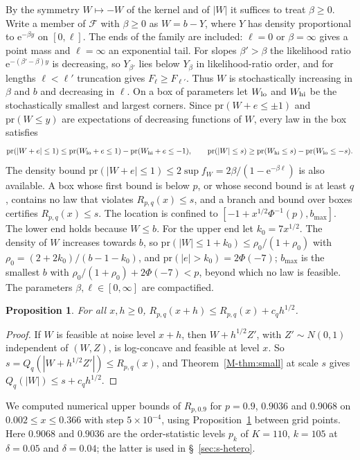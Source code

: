 \documentclass[11pt]{article}
\renewcommand{\_}{\usc\allowbreak}
\newtheorem{proposition}{Proposition}
\newcommand{\pr}{\mathrm{pr}}
\begin{document}
By the symmetry $W \mapsto -W$ of the kernel and of $|W|$ it suffices to treat $\beta \ge 0$. Write a member of $\mathcal F$ with $\beta \ge 0$ as $W = b - Y$, where $Y$ has density proportional to $\mathrm{e}^{-\beta y}$ on $[0,\ell]$. The ends of the family are included: $\ell = 0$ or $\beta = \infty$ gives a point mass and $\ell = \infty$ an exponential tail. For slopes $\beta' > \beta$ the likelihood ratio $\mathrm{e}^{-(\beta'-\beta)y}$ is decreasing, so $Y_{\beta'}$ lies below $Y_\beta$ in likelihood-ratio order, and for lengths $\ell < \ell'$ truncation gives $F_\ell \ge F_{\ell'}$. Thus $W$ is stochastically increasing in $\beta$ and $b$ and decreasing in $\ell$. On a box of parameters let $W_{\rm lo}$ and $W_{\rm hi}$ be the stochastically smallest and largest corners. Since $\pr(W + e \le \pm 1)$ and $\pr(W \le y)$ are expectations of decreasing functions of $W$, every law in the box satisfies
\[
\pr(|W+e| \le 1) \le \pr(W_{\rm lo} + e \le 1) - \pr(W_{\rm hi} + e \le -1),\qquad \pr(|W| \le s) \ge \pr(W_{\rm hi} \le s) - \pr(W_{\rm lo} \le -s).
\]
The density bound $\pr(|W+e| \le 1) \le 2\sup f_W = 2\beta/(1 - \mathrm{e}^{-\beta\ell})$ is also available. A box whose first bound is below $p$, or whose second bound is at least $q$, contains no law that violates $R_{p,q}(x) \le s$, and a branch and bound over boxes certifies $R_{p,q}(x) \le s$. The location is confined to $[-1 + x^{1/2}\Phi^{-1}(p), b_{\max}]$. The lower end holds because $W \le b$. For the upper end let $k_0 = 7x^{1/2}$. The density of $W$ increases towards $b$, so $\pr(|W| \le 1 + k_0) \le \rho_0/(1 + \rho_0)$ with $\rho_0 = (2 + 2k_0)/(b - 1 - k_0)$, and $\pr(|e| > k_0) = 2\Phi(-7)$; $b_{\max}$ is the smallest $b$ with $\rho_0/(1 + \rho_0) + 2\Phi(-7) < p$, beyond which no law is feasible. The parameters $\beta, \ell \in [0,\infty]$ are compactified.

\begin{proposition}\label{prop:continuity}
For all $x, h \ge 0$, $R_{p,q}(x + h) \le R_{p,q}(x) + c_q h^{1/2}$.
\end{proposition}

\begin{proof}
If $W$ is feasible at noise level $x + h$, then $W + h^{1/2}Z'$, with $Z' \sim N(0,1)$ independent of $(W, Z)$, is log-concave and feasible at level $x$. So $s = Q_q(|W + h^{1/2}Z'|) \le R_{p,q}(x)$, and Theorem~\ref{M-thm:small} at scale $s$ gives $Q_q(|W|) \le s + c_q h^{1/2}$.
\end{proof}

We computed numerical upper bounds of $R_{p,0.9}$ for $p = 0.9$, $0.9036$ and $0.9068$ on $0.002 \le x \le 0.366$ with step $5\times10^{-4}$, using Proposition~\ref{prop:continuity} between grid points. Here $0.9068$ and $0.9036$ are the order-statistic levels $p_k$ of $K = 110$, $k = 105$ at $\delta = 0.05$ and $\delta = 0.04$; the latter is used in \S~\ref{sec:s-hetero}.
\end{document}
